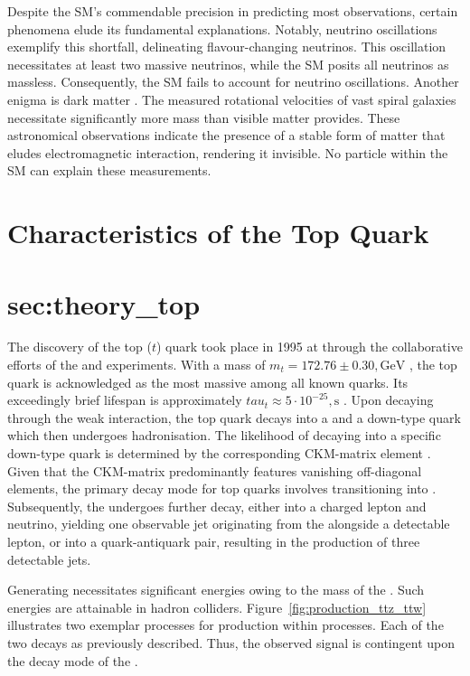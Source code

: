 Despite the SM's commendable precision in predicting most observations, certain phenomena elude its fundamental explanations. Notably, neutrino oscillations \cite{neutrino_oscillation} exemplify this shortfall, delineating flavour-changing neutrinos. This oscillation necessitates at least two massive neutrinos, while the SM posits all neutrinos as massless. Consequently, the SM fails to account for neutrino oscillations. Another enigma is dark matter \cite{dark_matter}. The measured rotational velocities of vast spiral galaxies necessitate significantly more mass than visible matter provides. These astronomical observations indicate the presence of a stable form of matter that eludes electromagnetic interaction, rendering it invisible. No particle within the SM can explain these measurements.


\section{Characteristics of the Top Quark}
\section{sec:theory_top}
The discovery of the top ($t$) quark took place in 1995 at \fermilab through the collaborative efforts of the \dzero \cite{top_production01} and \cdf \cite{top_production02} experiments. With a mass of $m_t=172.76\pm0.30,\text{GeV}$ \cite{top_mass}, the top quark is acknowledged as the most massive among all known quarks. Its exceedingly brief lifespan is approximately $tau_t\approx5\cdot10^{-25},\text{s}$ \cite{top_mass}. Upon decaying through the weak interaction, the top quark decays into a \wboson and a down-type quark which then undergoes hadronisation. The likelihood of decaying into a specific down-type quark is determined by the corresponding CKM-matrix element \cite{ckm_matrix}. Given that the CKM-matrix predominantly features vanishing off-diagonal elements, the primary decay mode for top quarks involves transitioning into \bquarks. Subsequently, the \wboson undergoes further decay, either into a charged lepton and neutrino, yielding one observable jet originating from the \bquark alongside a detectable lepton, or into a quark-antiquark pair, resulting in the production of three detectable jets.

Generating \tquarks necessitates significant energies owing to the mass of the \tquark. Such energies are attainable in hadron colliders. Figure~\ref{fig:production_ttz_ttw} illustrates two exemplar processes for \tquark production within \ttbar processes. Each of the two \tquarks decays as previously described. Thus, the observed signal is contingent upon the decay mode of the \wboson.


